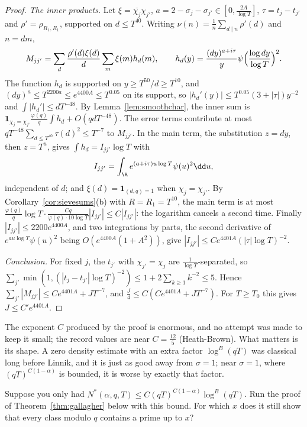\begin{proof}
\emph{The inner products.} Let $\xi=\overline{\chi_j}\chi_{j'}$, $a=2-\sigma_j-\sigma_{j'}\in[0,\frac{2A}{\log T}]$, $\tau=t_j-t_{j'}$ and $\rho'=\rho_{R_1,R_1}$, supported on $d\le T^{40}$. Writing $\nu(n)=\frac1n\sum_{d\mid n}\rho'(d)$ and $n=dm$,
\[
M_{jj'}=\sum_d\frac{\rho'(d)\xi(d)}d\sum_m\xi(m)h_d(m),\qquad h_d(y)=\frac{(dy)^{a+i\tau}}y\psi\Bigl(\frac{\log dy}{\log T}\Bigr)^2.
\]
The function $h_d$ is supported on $y\ge T^{50}/d\ge T^{10}$, and $(dy)^a\le T^{2200a}\le e^{4400A}\le T^{0.05}$ on its support, so $|h_d'(y)|\le T^{0.05}(3+|\tau|)y^{-2}$ and $\int|h_d'|\le dT^{-48}$. By Lemma~\ref{lem:smoothchar}, the inner sum is $\mathbf 1_{\chi_j=\chi_{j'}}\frac{\varphi(q)}q\int h_d+O(qdT^{-48})$. The error terms contribute at most $qT^{-48}\sum_{d\le T^{40}}\tau(d)^2\le T^{-7}$ to $M_{jj'}$. In the main term, the substitution $z=dy$, then $z=T^u$, gives $\int h_d=I_{jj'}\log T$ with
\[
I_{jj'}=\int_\R e^{(a+i\tau)u\log T}\psi(u)^2\dd u,
\]
independent of $d$; and $\xi(d)=\mathbf 1_{(d,q)=1}$ when $\chi_j=\chi_{j'}$. By Corollary~\ref{cor:sievesums}(b) with $R=R_1=T^{10}$, the main term is at most $\frac{\varphi(q)}q\log T\cdot\frac{Cq}{\varphi(q)\cdot10\log T}|I_{jj'}|\le C|I_{jj'}|$: the logarithm cancels a second time. Finally $|I_{jj'}|\le2200e^{4400A}$, and two integrations by parts, the second derivative of $e^{au\log T}\psi(u)^2$ being $O(e^{4400A}(1+A^2))$, give $|I_{jj'}|\le Ce^{4401A}(|\tau|\log T)^{-2}$.

\emph{Conclusion.} For fixed $j$, the $t_{j'}$ with $\chi_{j'}=\chi_j$ are $\frac1{\log T}$-separated, so $\sum_{j'}\min(1,(|t_j-t_{j'}|\log T)^{-2})\le1+2\sum_{k\ge1}k^{-2}\le5$. Hence $\sum_{j'}|M_{jj'}|\le Ce^{4401A}+JT^{-7}$, and $\frac J4\le C(Ce^{4401A}+JT^{-7})$. For $T\ge T_0$ this gives $J\le C'e^{4401A}$.
\end{proof}

The exponent $C$ produced by the proof is enormous, and no attempt was made to keep it small; the record values are near $C=\frac{12}5$ (Heath-Brown). What matters is its shape. A zero density estimate with an extra factor $\log^B(qT)$ was classical long before Linnik, and it is just as good away from $\sigma=1$; near $\sigma=1$, where $(qT)^{C(1-\alpha)}$ is bounded, it is worse by exactly that factor.

\begin{think}
Suppose you only had $N^*(\alpha,q,T)\le C(qT)^{C(1-\alpha)}\log^B(qT)$. Run the proof of Theorem~\ref{thm:gallagher} below with this bound. For which $x$ does it still show that every class modulo $q$ contains a prime up to $x$?
\end{think}

